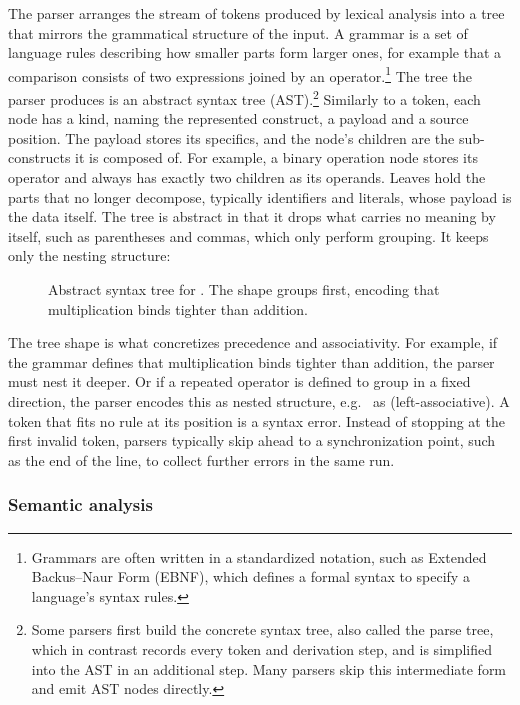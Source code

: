 The parser arranges the stream of tokens produced by lexical analysis
into a tree that mirrors the grammatical structure of the input.
A grammar is a set of language rules describing how smaller parts form larger ones,
for example that a comparison consists of two expressions joined by an operator.\footnote{
	Grammars are often written in a standardized notation,
	such as Extended Backus–Naur Form (EBNF),
	which defines a formal syntax to specify a language's syntax rules.
}
The tree the parser produces is an abstract syntax tree (AST).\footnote{
	Some parsers first build the concrete syntax tree, also called the parse tree,
	which in contrast records every token and derivation step,
	and is simplified into the AST in an additional step.
	Many parsers skip this intermediate form and emit AST nodes directly.
}
Similarly to a token, each node has a kind, naming the represented construct,
a payload and a source position.
The payload stores its specifics,
and the node's children are the sub-constructs it is composed of.
For example, a binary operation node stores its operator
and always has exactly two children as its operands.
Leaves hold the parts that no longer decompose,
typically identifiers and literals, whose payload is the data itself.
The tree is abstract in that it drops what carries no meaning by itself,
such as parentheses and commas, which only perform grouping.
It keeps only the nesting structure:

\begin{figure}[H]
	\centering
	
	\caption{Abstract syntax tree for . The shape groups  first, encoding that multiplication binds tighter than addition.}
	\label{fig:ast}
\end{figure}

The tree shape is what concretizes precedence and associativity.
For example, if the grammar defines that multiplication binds tighter than addition,
the parser must nest it deeper.
Or if a repeated operator is defined to group in a fixed direction,
the parser encodes this as nested structure,
e.g.\  as  (left-associative).
A token that fits no rule at its position is a syntax error.
Instead of stopping at the first invalid token,
parsers typically skip ahead to a synchronization point,
such as the end of the line, to collect further errors in the same run.

\subsubsection{Semantic analysis}

